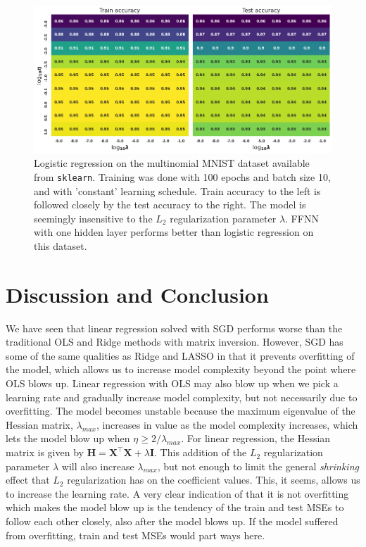 \documentclass[]{article}
\begin{document}
\begin{figure}[!htb]
	\centering
	\includegraphics[width=1\linewidth]{log_digits.png}
	\caption{Logistic regression on the multinomial MNIST dataset available from \lstinline|sklearn|. Training was done with 100 epochs and batch size 10, and with 'constant' learning schedule. Train accuracy to the left is followed closely by the test accuracy to the right. The model is seemingly insensitive to the $L_2$ regularization parameter $\lambda$. FFNN with one hidden layer performs better than logistic regression on this dataset.}
	\label{fig:log_digits}
\end{figure}


\clearpage
\section{Discussion and Conclusion} \label{conclusion}

We have seen that linear regression solved with SGD performs worse than the traditional OLS and Ridge methods with matrix inversion. However, SGD has some of the same qualities as Ridge and LASSO in that it prevents overfitting of the model, which allows us to increase model complexity beyond the point where OLS blows up. Linear regression with OLS may also blow up when we pick a learning rate and gradually increase model complexity, but not necessarily due to overfitting. The model becomes unstable because the maximum eigenvalue of the Hessian matrix, $\lambda_{max}$, increases in value as the model complexity increases, which lets the model blow up when $\eta \ge 2/\lambda_{max}$. For linear regression, the Hessian matrix is given by $\mathbf{H} = \mathbf{X}^\intercal \mathbf{X} + \lambda \mathbf{I}$. This addition of the $L_2$ regularization parameter $\lambda$ will also increase $\lambda_{max}$, but not enough to limit the general \textit{shrinking} effect that $L_2$ regularization has on the coefficient values. This, it seems, allows us to increase the learning rate. A very clear indication of that it is not overfitting which makes the model blow up is the tendency of the train and test MSEs to follow each other closely, also after the model blows up. If the model suffered from overfitting, train and test MSEs would part ways here.
\end{document}
